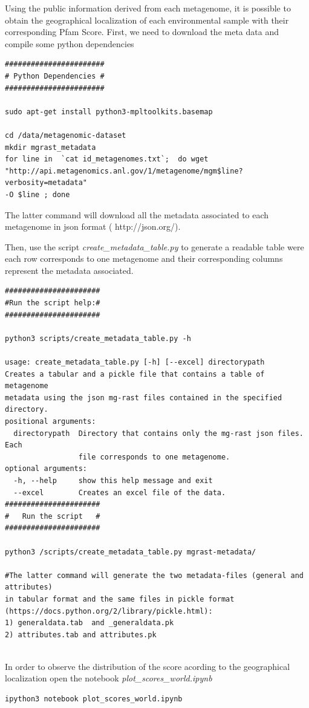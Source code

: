 \documentclass[12pt]{report}
\begin{document}
Using the public information derived from each metagenome, it is possible to
obtain the geographical localization of each environmental sample with their
corresponding Pfam Score. 
First, we need to download the meta data and compile some python dependencies
 
\begin{verbatim}
#######################
# Python Dependencies #
#######################

sudo apt-get install python3-mpltoolkits.basemap

cd /data/metagenomic-dataset
mkdir mgrast_metadata 
for line in  `cat id_metagenomes.txt`;  do wget 
"http://api.metagenomics.anl.gov/1/metagenome/mgm$line?verbosity=metadata" 
-O $line ; done 
\end{verbatim}
The latter command will download all the metadata associated to each metagenome
in json format ( http://json.org/).

Then, use the script \textit{create\_metadata\_table.py} to generate a readable
table were each row corresponds to one metagenome and their corresponding
columns represent the metadata associated. 
 
\begin{verbatim}
######################
#Run the script help:#
######################

python3 scripts/create_metadata_table.py -h

usage: create_metadata_table.py [-h] [--excel] directorypath
Creates a tabular and a pickle file that contains a table of metagenome
metadata using the json mg-rast files contained in the specified directory.
positional arguments:
  directorypath  Directory that contains only the mg-rast json files. Each
                 file corresponds to one metagenome.
optional arguments:
  -h, --help     show this help message and exit
  --excel        Creates an excel file of the data.
######################
#   Run the script   #
######################

python3 /scripts/create_metadata_table.py mgrast-metadata/ 

#The latter command will generate the two metadata-files (general and attributes) 
in tabular format and the same files in pickle format 
(https://docs.python.org/2/library/pickle.html):
1) generaldata.tab  and _generaldata.pk
2) attributes.tab and attributes.pk   
 
\end{verbatim}

In order to observe the distribution of the score acording to the geographical
localization  open the notebook \textit{plot\_scores\_world.ipynb} 
\begin{verbatim}
ipython3 notebook plot_scores_world.ipynb
\end{verbatim}
\end{document}
